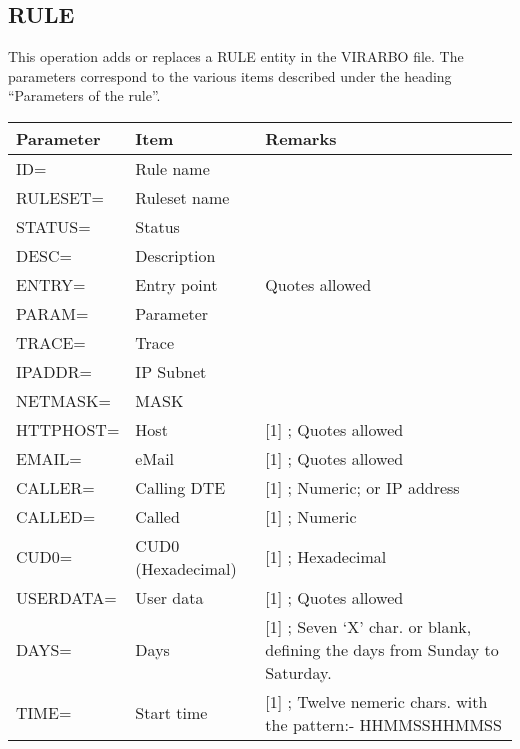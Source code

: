 \documentclass[letterpaper,10pt,english]{sphinxmanual}
\begin{document}
\ignorespaces 

\subsection{RULE}
\label{\detokenize{Installation_Guide:rule}}\label{\detokenize{Installation_Guide:index-170}}
This operation adds or replaces a RULE entity in the VIRARBO file. The parameters correspond to the various items described under the heading “Parameters of the rule”.


\begin{savenotes}\sphinxattablestart
\centering
\begin{tabulary}{\linewidth}[t]{|T|T|T|}
\hline
\sphinxstyletheadfamily 
Parameter
&\sphinxstyletheadfamily 
Item
&\sphinxstyletheadfamily 
Remarks
\\
\hline
ID=
&
Rule name
&\\
\hline
RULESET=
&
Ruleset name
&\\
\hline
STATUS=
&
Status
&\\
\hline
DESC=
&
Description
&\\
\hline
ENTRY=
&
Entry point
&
Quotes allowed
\\
\hline
PARAM=
&
Parameter
&\\
\hline
TRACE=
&
Trace
&\\
\hline
IPADDR=
&
IP Subnet
&\\
\hline
NETMASK=
&
MASK
&\\
\hline
HTTPHOST=
&
Host
&
{[}1{]} ; Quotes allowed
\\
\hline
EMAIL=
&
eMail
&
{[}1{]} ; Quotes allowed
\\
\hline
CALLER=
&
Calling DTE
&
{[}1{]} ; Numeric; or IP address
\\
\hline
CALLED=
&
Called
&
{[}1{]} ; Numeric
\\
\hline
CUD0=
&
CUD0 (Hexadecimal)
&
{[}1{]} ; Hexadecimal
\\
\hline
USERDATA=
&
User data
&
{[}1{]} ; Quotes allowed
\\
\hline
DAYS=
&
Days
&
{[}1{]} ; Seven ‘X’ char. or blank, defining the days
from Sunday to Saturday.
\\
\hline
TIME=
&
Start time
&
{[}1{]} ; Twelve nemeric chars. with the pattern:-
HHMMSSHHMMSS
\\
\hline
\end{tabulary}
\par
\sphinxattableend\end{savenotes}
\end{document}
